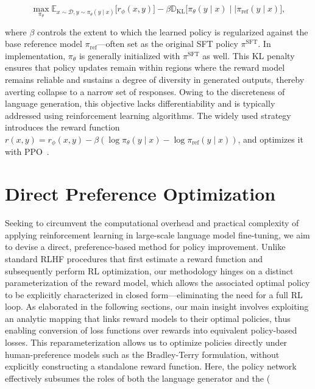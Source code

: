 \begin{equation}\label{eq:RL}
\max_{\pi_{\theta}}  \mathbb{E}_{x\sim \mathcal{D}, y\sim \pi_{\theta}(y \mid x)}\bigl[r_{\phi}(x, y)\bigr] - \beta\mathbb{D}_{\textrm{KL}}\bigl[\pi_{\theta}(y\mid x)\mid \mid \pi_\text{ref}(y\mid x)\bigr],
\end{equation}

where $\beta$ controls the extent to which the learned policy is regularized against the base reference model $\pi_\text{ref}$—often set as the original SFT policy $\pi^\text{SFT}$. 
In implementation, $\pi_\theta$ is generally initialized with $\pi^\text{SFT}$ as well. This KL penalty ensures that policy updates remain within regions where the reward model remains reliable and sustains a degree of diversity in generated outputs, thereby averting collapse to a narrow set of responses. Owing to the discreteness of language generation, this objective lacks differentiability and is typically addressed using reinforcement learning algorithms. The widely used strategy~\cite{ziegler2020finetuning, stiennon2022learning, bai2022training, ouyang2022training} introduces the reward function ${r(x, y) = r_{\phi}(x, y) -\beta (\log \pi_{\theta}(y\mid x) - \log \pi_\text{ref}(y\mid x))}$, and optimizes it with PPO~\cite{schulman2017proximal}. 

\section{Direct Preference Optimization}\label{sec:DPO}

Seeking to circumvent the computational overhead and practical complexity of applying reinforcement learning in large-scale language model fine-tuning, we aim to devise a direct, preference-based method for policy improvement. Unlike standard RLHF procedures that first estimate a reward function and subsequently perform RL optimization, our methodology hinges on a distinct parameterization of the reward model, which allows the associated optimal policy to be explicitly characterized in closed form—eliminating the need for a full RL loop. As elaborated in the following sections, our main insight involves exploiting an analytic mapping that links reward models to their optimal policies, thus enabling conversion of loss functions over rewards into equivalent policy-based losses. This reparameterization allows us to optimize policies directly under human-preference models such as the Bradley-Terry formulation, without explicitly constructing a standalone reward function. Here, the policy network effectively subsumes the roles of both the language generator and the (

